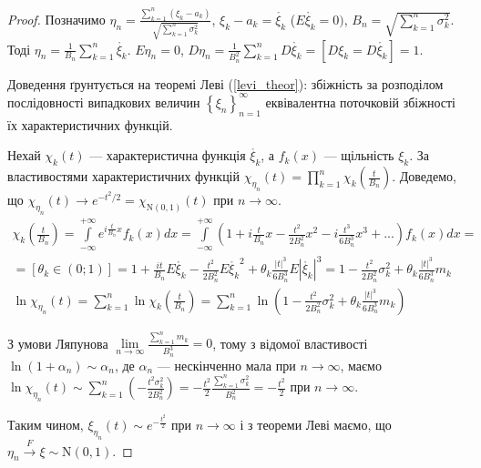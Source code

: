 \begin{proof}
    Позначимо $\eta_n = \frac{\sum\limits_{k=1}^n (\xi_k - a_k)}
    {\sqrt{\sum\limits_{k=1}^n \sigma_k^2}}$, $\xi_k - a_k = \mathring{\xi_k}$ ($E\mathring{\xi_k} = 0)$, 
    $B_n = \sqrt{\sum\limits_{k=1}^n \sigma_k^2}$. 
    Тоді $\eta_n = \frac{1}{B_n}\sum\limits_{k=1}^n \mathring{\xi_k}$.
    $E\eta_n = 0$, $D\eta_n = \frac{1}{B_n^2}\sum\limits_{k=1}^n D\mathring{\xi_k} = 
    \left[D\xi_k = D\mathring{\xi_k}\right] = 1$.

    Доведення ґрунтується на теоремі Леві (\ref{levi_theor}): збіжність за розподілом послідовності 
    випадкових величин $\left\{ \xi_n\right\}_{n=1}^{\infty}$ еквівалентна поточковій збіжності їх
    характеристичних функцій.

    Нехай $\chi_k(t)$ --- характеристична функція $\mathring{\xi_k}$, а $f_k(x)$ --- 
    щільність $\xi_k$.
    За властивостями характеристичних функцій $\chi_{\eta_n}(t) = 
    \prod\limits_{k=1}^n \chi_k(\frac{t}{B_n})$. 
    Доведемо, що $\chi_{\eta_n}(t)\to e^{-t^2/2} = 
    \chi_{\mathrm{N}(0, 1)}(t)$ при $ n \to \infty$.
    \begin{gather*}\chi_k\left(\frac{t}{B_n}\right) = \int\limits_{-\infty}^{+\infty} e^{i\frac{t}{B_n}x}f_k(x)dx = 
    \int\limits_{-\infty}^{+\infty} \left(1 + i\frac{t}{B_n}x - \frac{t^2}{2B_n^2}x^2 - 
    i\frac{t^3}{6B_n^3}x^3 + ...\right)f_k(x) dx = \\ = \left[\theta_k \in (0; 1)\right]
    = 1 + \frac{it}{B_n}E\mathring{\xi_k} - \frac{t^2}{2B_n^2}
    E\mathring{\xi_k}^2 + \theta_k\frac{|t|^3}{6B_n^3}E|\mathring{\xi_k}|^3 = 
    1 - \frac{t^2}{2B_n^2}\sigma_k^2 + \theta_k\frac{|t|^3}{6B_n^3}m_k \\
    \ln\chi_{\eta_n}(t) = \sum\limits_{k=1}^n \ln \chi_k \left(\frac{t}{B_n}\right) = 
    \sum\limits_{k=1}^n \ln\left(1 - \frac{t^2}{2B_n^2}\sigma_k^2 + 
    \theta_k\frac{|t|^3}{6B_n^3}m_k\right)
    \end{gather*}

    З умови Ляпунова $\underset{n \rightarrow \infty}{\lim} \frac{\sum\limits_{k=1}^n m_k}{B_n^3} = 0$, 
    тому з відомої властивості $\ln(1 + \alpha_n) \sim \alpha_n$, де $\alpha_n$ --- нескінченно мала при 
    $n \rightarrow \infty$, маємо $\ln\chi_{\eta_n}(t) \sim \sum\limits_{k=1}^n\left(
        -\frac{t^2\sigma^2_k}{2B_n^2}
    \right) 
    = -\frac{t^2}{2}\frac{\sum\limits_{k=1}^n\sigma_k^2}{B_n^2} = -\frac{t^2}{2}
    $ при $n \rightarrow \infty$.
    
    Таким чином, $\xi_{\eta_n}(t) \sim e^{-\frac{t^2}{2}}$ при $n \rightarrow \infty$ і 
    з теореми Леві маємо, що $\eta_n \overset{F}{\longrightarrow} \xi \sim \mathrm{N}(0, 1)$.
\end{proof}
